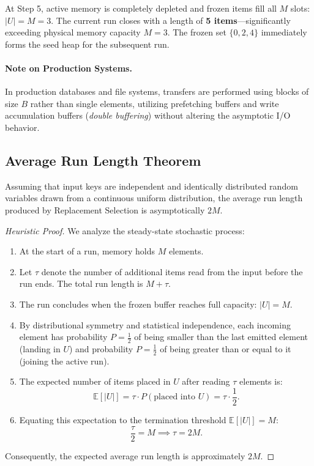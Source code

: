 At Step 5, active memory is completely depleted and frozen items fill all $M$ slots: $\vert{}U\vert{} = M = 3$. The current run closes with a length of \textbf{5 items}—significantly exceeding physical memory capacity $M = 3$. The frozen set $\{0, 2, 4\}$ immediately forms the seed heap for the subsequent run.

\paragraph{Note on Production Systems.}
In production databases and file systems, transfers are performed using blocks of size $B$ rather than single elements, utilizing prefetching buffers and write accumulation buffers (\textit{double buffering}) without altering the asymptotic I/O behavior.

\subsection{Average Run Length Theorem}
\label{subsec:snow-plow-theorem}

\begin{theorem}
\label{thm:snow-plow-length}
Assuming that input keys are independent and identically distributed random variables drawn from a continuous uniform distribution, the average run length produced by Replacement Selection is asymptotically $2M$.
\end{theorem}

\begin{proof}[Heuristic Proof]
We analyze the steady-state stochastic process:
\begin{enumerate}
  \item At the start of a run, memory holds $M$ elements.
  \item Let $\tau$ denote the number of additional items read from the input before the run ends. The total run length is $M + \tau$.
  \item The run concludes when the frozen buffer reaches full capacity: $\vert{}U\vert{} = M$.
  \item By distributional symmetry and statistical independence, each incoming element has probability $P = \frac{1}{2}$ of being smaller than the last emitted element (landing in $U$) and probability $P = \frac{1}{2}$ of being greater than or equal to it (joining the active run).
  \item The expected number of items placed in $U$ after reading $\tau$ elements is:
  \begin{equation}
    \mathbb{E}[\vert{}U\vert{}] = \tau \cdot P(\text{placed into } U) = \tau \cdot \frac{1}{2}.
  \end{equation}
  \item Equating this expectation to the termination threshold $\mathbb{E}[\vert{}U\vert{}] = M$:
  \begin{equation}
    \frac{\tau}{2} = M \implies \tau = 2M.
  \end{equation}
\end{enumerate}
Consequently, the expected average run length is approximately $2M$.
\end{proof}

